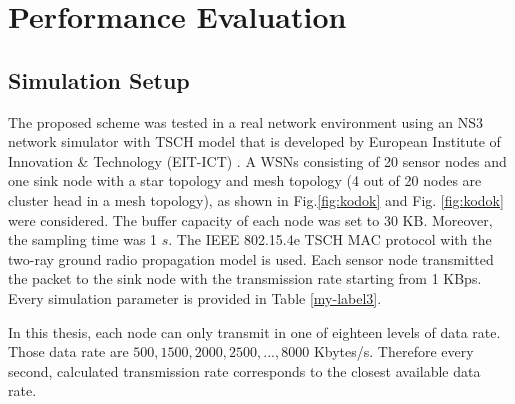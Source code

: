 \chapter{Performance Evaluation}

\section{Simulation Setup}




The proposed scheme was tested in a real network environment using an NS3 network simulator with TSCH model that is developed by European Institute of Innovation \& Technology (EIT-ICT) \cite{tschweb, 7820597}. A WSNs consisting of 20 sensor nodes and one sink node with a star topology and mesh topology (4 out of 20 nodes are cluster head in a mesh topology), as shown in Fig.\ref{fig:kodok} and Fig. \ref{fig:kodok} were considered. The buffer capacity of each node was set to 30 KB. Moreover, the sampling time was 1 $s$.  The IEEE 802.15.4e  TSCH MAC protocol with the two-ray ground radio propagation model is used. Each sensor node transmitted the packet to the sink node with the transmission rate starting from 1 KBps. Every simulation parameter is provided in Table \ref{my-label3}.

In this thesis, each node can only transmit in one of eighteen levels of data rate. Those data rate are $500, 1500, 2000, 2500, ..., 8000$ Kbytes/s. Therefore every second, calculated transmission rate corresponds to the closest available data rate. 

